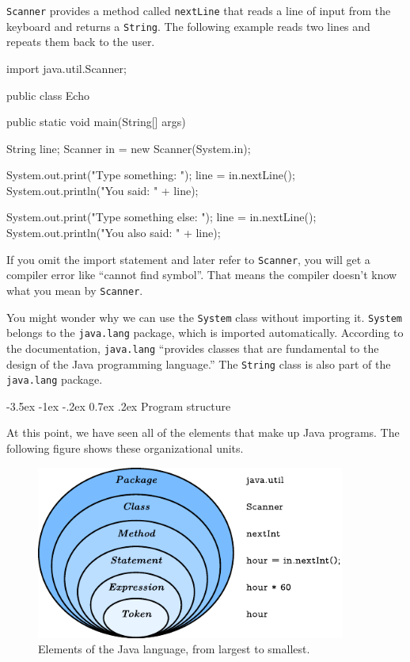 \documentclass[12pt]{book}
\makeatletter
\theoremstyle{exercise}
\newcommand{\java}[1]{\verb"#1"}
\renewcommand{\section}{\@startsection{section}{1}{\z@}%
    {-3.5ex \@plus -1ex \@minus -.2ex}%
    {0.7ex \@plus.2ex}%
    {\normalfont\Large\bfseries}}
\newcommand{\java}[1]{\lstinline{#1}} %
\makeatother
\begin{document}
\java{Scanner} provides a method called \java{nextLine} that reads a line of input from the keyboard and returns a \java{String}.
The following example reads two lines and repeats them back to the user.

\begin{code}
import java.util.Scanner;

public class Echo {
    public static void main(String[] args) {
        String line;
        Scanner in = new Scanner(System.in);

        System.out.print("Type something: ");
        line = in.nextLine();
        System.out.println("You said: " + line);

        System.out.print("Type something else: ");
        line = in.nextLine();
        System.out.println("You also said: " + line);
    }
}
\end{code}

If you omit the import statement and later refer to \java{Scanner}, you will get a compiler error like ``cannot find symbol''.
That means the compiler doesn't know what you mean by \java{Scanner}.

You might wonder why we can use the \java{System} class without importing it.
\java{System} belongs to the \java{java.lang} package, which is imported automatically.
According to the documentation, \java{java.lang} ``provides classes that are fundamental to the design of the Java programming language.''
The \java{String} class is also part of the \java{java.lang} package.


\section{Program structure}
\label{sec:library}

At this point, we have seen all of the elements that make up Java programs.
The following figure shows these organizational units.

\begin{figure}[!h]
\begin{center}
\includegraphics[width=4in]{figs/package.pdf}
\caption{Elements of the Java language, from largest to smallest.}
\end{center}
\end{figure}
\end{document}
